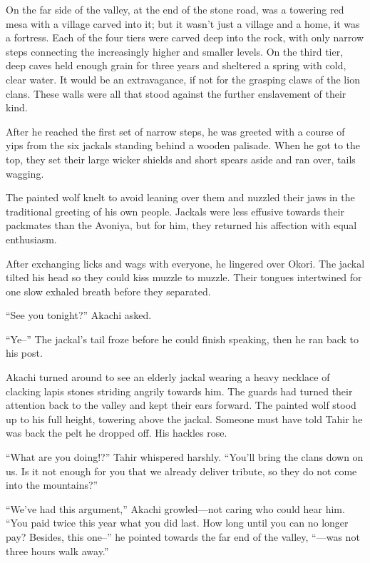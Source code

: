 On the far side of the valley, at the end of the stone road, was a towering red mesa with a village carved into it; but it wasn't just a village and a home, it was a fortress. Each of the four tiers were carved deep into the rock, with only narrow steps connecting the increasingly higher and smaller levels. On the third tier, deep caves held enough grain for three years and sheltered a spring with cold, clear water. It would be an extravagance, if not for the grasping claws of the lion clans. These walls were all that stood against the further enslavement of their kind.

After he reached the first set of narrow steps, he was greeted with a course of yips from the six jackals standing behind a wooden palisade. When he got to the top, they set their large wicker shields and short spears aside and ran over, tails wagging.

The painted wolf knelt to avoid leaning over them and nuzzled their jaws in the traditional greeting of his own people. Jackals were less effusive towards their packmates than the Avoniya, but for him, they returned his affection with equal enthusiasm.

After exchanging licks and wags with everyone, he lingered over Okori. The jackal tilted his head so they could kiss muzzle to muzzle. Their tongues intertwined for one slow exhaled breath before they separated.

``See you tonight?'' Akachi asked.

``Ye--'' The jackal's tail froze before he could finish speaking, then he ran back to his post.

Akachi turned around to see an elderly jackal wearing a heavy necklace of clacking lapis stones striding angrily towards him. The guards had turned their attention back to the valley and kept their ears forward. The painted wolf stood up to his full height, towering above the jackal. Someone must have told Tahir he was back the pelt he dropped off. His hackles rose.

``What are you doing!?'' Tahir whispered harshly. ``You'll bring the clans down on us. Is it not enough for you that we already deliver tribute, so they do not come into the mountains?''

``We've had this argument,'' Akachi growled---not caring who could hear him. ``You paid twice this year what you did last. How long until you can no longer pay? Besides, this one--'' he pointed towards the far end of the valley, ``---was not three hours walk away.''

